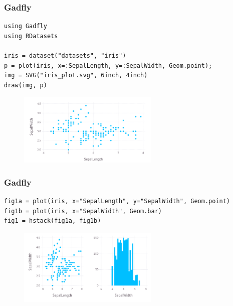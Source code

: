 \begin{frame}[fragile]
	\frametitle{Gadfly}
  \begin{tiny}
  \begin{verbatim}
using Gadfly
using RDatasets

iris = dataset("datasets", "iris")
p = plot(iris, x=:SepalLength, y=:SepalWidth, Geom.point);
img = SVG("iris_plot.svg", 6inch, 4inch)
draw(img, p)
  \end{verbatim}
  \end{tiny}
  \begin{figure}[ht]
    \centering
    \includegraphics[width=0.6\textwidth]{gadfly1}
  \end{figure}
\end{frame}

\begin{frame}[fragile]
	\frametitle{Gadfly}
  \begin{tiny}
  \begin{verbatim}
fig1a = plot(iris, x="SepalLength", y="SepalWidth", Geom.point)
fig1b = plot(iris, x="SepalWidth", Geom.bar)
fig1 = hstack(fig1a, fig1b)
  \end{verbatim}
  \end{tiny}
  \begin{figure}[ht]
    \centering
    \includegraphics[width=0.6\textwidth]{gadfly2}
  \end{figure}
\end{frame}

